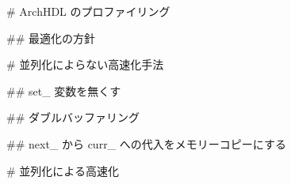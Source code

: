 # ArchHDL のプロファイリング





## 最適化の方針







# 並列化によらない高速化手法






## set_ 変数を無くす





## ダブルバッファリング






## next_ から curr_ への代入をメモリーコピーにする







# 並列化による高速化








